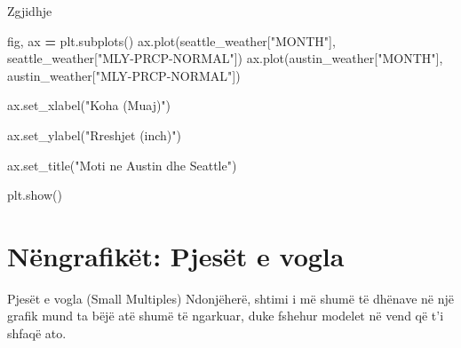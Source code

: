 \documentclass[
  ignorenonframetext,
]{beamer}
\newenvironment{Shaded}{\begin{snugshade}}{\end{snugshade}}
\newcommand{\NormalTok}[1]{#1}
\newcommand{\OperatorTok}[1]{\textcolor[rgb]{0.81,0.36,0.00}{\textbf{#1}}}
\newcommand{\StringTok}[1]{\textcolor[rgb]{0.31,0.60,0.02}{#1}}
\begin{document}
\begin{frame}[fragile]{Zgjidhje}
\protect\hypertarget{zgjidhje-3}{}

\begin{Shaded}
\begin{Highlighting}[]
\NormalTok{fig, ax }\OperatorTok{=}\NormalTok{ plt.subplots()}
\NormalTok{ax.plot(seattle\_weather[}\StringTok{"MONTH"}\NormalTok{], seattle\_weather[}\StringTok{"MLY{-}PRCP{-}NORMAL"}\NormalTok{])}
\NormalTok{ax.plot(austin\_weather[}\StringTok{"MONTH"}\NormalTok{], austin\_weather[}\StringTok{"MLY{-}PRCP{-}NORMAL"}\NormalTok{])}

\NormalTok{ax.set\_xlabel(}\StringTok{"Koha (Muaj)"}\NormalTok{)}

\NormalTok{ax.set\_ylabel(}\StringTok{"Rreshjet (inch)"}\NormalTok{)}

\NormalTok{ax.set\_title(}\StringTok{"Moti ne Austin dhe Seattle"}\NormalTok{)}

\NormalTok{plt.show()}
\end{Highlighting}
\end{Shaded}
\end{frame}

\hypertarget{nuxebngrafikuxebt-pjesuxebt-e-vogla}{%
\section{Nëngrafikët: Pjesët e
vogla}\label{nuxebngrafikuxebt-pjesuxebt-e-vogla}}

\begin{frame}{Pjesët e vogla (Small Multiples)}
\protect\hypertarget{pjesuxebt-e-vogla-small-multiples}{}
Ndonjëherë, shtimi i më shumë të dhënave në një grafik mund ta bëjë atë
shumë të ngarkuar, duke fshehur modelet në vend që t'i shfaqë ato.
\end{frame}
\end{document}
